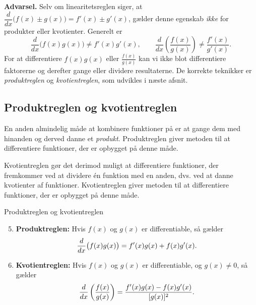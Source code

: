 \textbf{Advarsel.} Selv om linearitetsreglen siger, at $\dfrac{d}{dx}\big(f(x)\pm g(x)\big)=f'(x)\pm g'(x)$, gælder denne egenskab \emph{ikke} for produkter eller kvotienter. Generelt er
\[
\frac{d}{dx}\big(f(x)g(x)\big)\neq f'(x)g'(x),
\qquad
\frac{d}{dx}\left(\frac{f(x)}{g(x)}\right)\neq \frac{f'(x)}{g'(x)}.
\]
For at differentiere $f(x)g(x)$ eller $\frac{f(x)}{g(x)}$ kan vi ikke blot differentiere faktorerne og derefter gange eller dividere resultaterne. De korrekte teknikker er \emph{produktreglen} og \emph{kvotientreglen}, som udvikles i næste afsnit.

\subsection*{Produktreglen og kvotientreglen}

En anden almindelig måde at kombinere funktioner på er at gange dem med hinanden og derved danne et \emph{produkt}. Produktreglen giver metoden til at differentiere funktioner, der er opbygget på denne måde. 

Kvotientreglen gør det derimod muligt at differentiere funktioner, der fremkommer ved at dividere én funktion
med en anden, dvs. ved at danne kvotienter af funktioner. Kvotientreglen giver metoden til at differentiere funktioner, der er opbygget på denne måde.

\begin{theorem}{Produktreglen og kvotientreglen}
    \begin{enumerate}
        \setcounter{enumi}{4}
        \vspace{0.5em}
        \item \textbf{Produktreglen:} Hvis \(f(x)\) og \(g(x)\) er differentiable, så gælder \vspace{0.5em}
        \[
        \frac{d}{dx}\big(f(x)g(x)\big)=f'(x)g(x)+f(x)g'(x). \vspace{0.5em}
        \] \vspace{0.5em}
        \item \textbf{Kvotientreglen:} Hvis \(f(x)\) og \(g(x)\) er differentiable, og \(g(x)\neq0\), så gælder
        \vspace{0.5em}
        \[
        \frac{d}{dx}\left(\frac{f(x)}{g(x)}\right)=\frac{f'(x)g(x)-f(x)g'(x)}{[g(x)]^2}. \vspace{0.5em}
        \]
    \end{enumerate}
\end{theorem}

